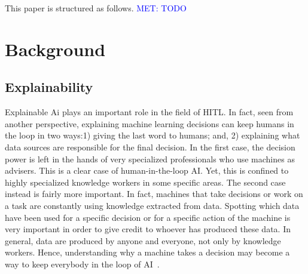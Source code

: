 \documentclass[twoside,11pt]{article}
\newcommand{\sd}[1]{\textcolor{red}{[#1 \textsc{--Srijita}]}}
\newcommand{\MET}[1]{\textcolor{blue}{MET: #1}}
\begin{document}



This paper is structured as follows. \MET{TODO}

\section{Background}
\label{sec:background}

\subsection{Explainability}

Explainable Ai plays an important role in the field of HITL. In fact, seen from another perspective, explaining machine learning decisions can keep humans in the loop in two ways:1) giving the last word to humans; and, 2) explaining what data sources are responsible for the final decision.  In the first case, the decision power is left in the hands of very specialized professionals who use machines as advisers.  This is a clear case of human-in-the-loop AI. Yet,  this is confined to highly specialized knowledge workers in some specific areas.  The second case instead is fairly more important.  In fact, machines that take decisions or work on a task are constantly using knowledge extracted from data.  Spotting which data have been used for a specific decision or for a specific action of the machine is very important in order to give credit to whoever has produced these data.  In general, data are produced by anyone and everyone, not only by knowledge workers.  Hence, understanding why a machine takes a decision may become a way to keep everybody in the loop of AI~\cite{zanzotto2019human}.
\end{document}
